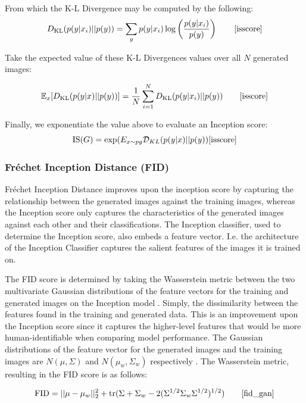 \documentclass[%
 reprint,
 amsmath,amssymb,
 aps,
]{revtex4-2}
\begin{document}
From which the K-L Divergence may be computed by the following:
\begin{equation}
    D_{\text{KL}}(p(y|x_i) || p(y)) = \sum_{y} p(y|x_i) \log \left( \frac{p(y|x_i)}{p(y)} \right)\qquad
    \cite{isscore}
\end{equation}

Take the expected value of these K-L Divergences values over all $N$ generated images:

\begin{equation}
    \mathbb{E}_{x}[D_{\text{KL}}(p(y|x) || p(y))] = \frac{1}{N} \sum_{i=1}^{N} D_{\text{KL}}(p(y|x_i) || p(y))\qquad
\cite{isscore}
\end{equation}

Finally, we exponentiate the value above to evaluate an Inception score:
\begin{equation}
\text{IS}(G) = \exp (E_{x\sim pg} \mathcal{D}_{KL}( p(y|x) || p(y) )
\cite{isscore}
\end{equation}

\subsubsection{Fréchet Inception Distance (FID)}
Fréchet Inception Distance improves upon the inception score by capturing the relationship between the generated images against the training images, whereas the Inception score only captures the characteristics of the generated images against each other and their classifications. The Inception classifier, used to determine the Inception score, also embeds a feature vector. I.e. the architecture of the Inception Classifier captures the salient features of the images it is trained on.



The FID score is determined by taking the Wasserstein metric between the two multivariate Gaussian distributions of the feature vectors for the training and generated images on the Inception model \cite{NIPS2017_8a1d6947}. Simply, the dissimilarity between the features found in the training and generated data. This is an improvement upon the Inception score since it captures the higher-level features that would be more human-identifiable when comparing model performance. The Gaussian distributions of the feature vector for the generated images and the training images are $N(\mu, \Sigma)$ and $N(\mu_w, \Sigma_w)$ respectively \cite{fid_gan}. The Wasserstein metric, resulting in the FID score is as follows:

\begin{equation}
\text{FID}=||\mu -\mu _{w}||_{2}^{2}+\operatorname {tr} (\Sigma +\Sigma _{w}-2(\Sigma ^{1/2}\Sigma _{w}\Sigma ^{1/2})^{1/2})\qquad
\cite{fid_gan}
\end{equation}
\end{document}
